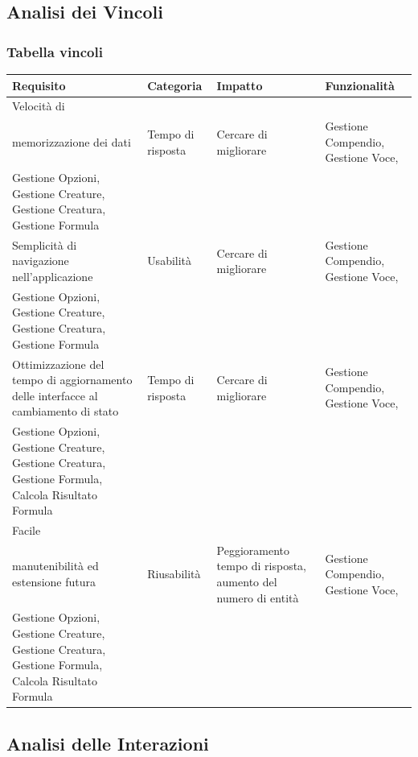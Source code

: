 \documentclass[a4paper, 11pt]{article}
\let\newline\\
\begin{document}
\clearpage
\newpage
\subsection{Analisi dei Vincoli}
\subsubsection*{Tabella vincoli}
\begin{center}
    \begin{tabular}{|p{3cm}|p{3cm}|p{3.5cm}|p{3.5cm}|}
        \hline
        \textbf{Requisito} & \textbf{Categoria} & \textbf{Impatto} & \textbf{Funzionalità} \\
        \hline
        Velocità di \newline memorizzazione dei dati & Tempo di risposta & Cercare di migliorare & Gestione Compendio, Gestione Voce, \newline Gestione Opzioni, Gestione Creature, Gestione Creatura, Gestione Formula \\
        \hline
        Semplicità di navigazione nell'applicazione & Usabilità & Cercare di migliorare & Gestione Compendio, Gestione Voce, \newline Gestione Opzioni, Gestione Creature, Gestione Creatura, Gestione Formula \\
        \hline
        Ottimizzazione del tempo di aggiornamento delle interfacce al cambiamento di stato & Tempo di risposta & Cercare di migliorare & Gestione Compendio, Gestione Voce, \newline Gestione Opzioni, Gestione Creature, Gestione Creatura, Gestione Formula, Calcola Risultato Formula \\
        \hline
        Facile \newline manutenibilità ed estensione futura & Riusabilità & Peggioramento tempo di risposta, aumento del numero di entità & Gestione Compendio, Gestione Voce, \newline Gestione Opzioni, Gestione Creature, Gestione Creatura, Gestione Formula, Calcola Risultato Formula \\
        \hline
    \end{tabular}
\end{center}

\clearpage
\newpage
\subsection{Analisi delle Interazioni}
\end{document}
